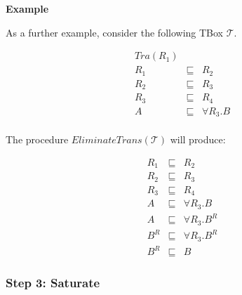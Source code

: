 \documentclass[oneside]{book}
\newcommand{\T}{\mathcal{T}}
\newcommand{\dlisa}{\sqsubseteq}
\begin{document}
\textbf{Example}

As a further example, consider the following TBox $\T$.

\[
\begin{array}{lll}
Tra(R_1) && \\
R_1 & \dlisa & R_2 \\
R_2 & \dlisa & R_3 \\
R_3 & \dlisa & R_4 \\
A & \dlisa & \forall R_3.B \\
\end{array}
\]

The procedure $EliminateTrans(\T)$ will produce:

\[
\begin{array}{lll}
R_1 & \dlisa & R_2 \\
R_2 & \dlisa & R_3 \\
R_3 & \dlisa & R_4 \\
A & \dlisa & \forall R_3.B \\
A & \dlisa & \forall R_3.B^R \\
B^R & \dlisa & \forall R_3.B^R \\
B^R & \dlisa & B
\end{array}
\]


\subsubsection{Step 3: Saturate}
\end{document}
